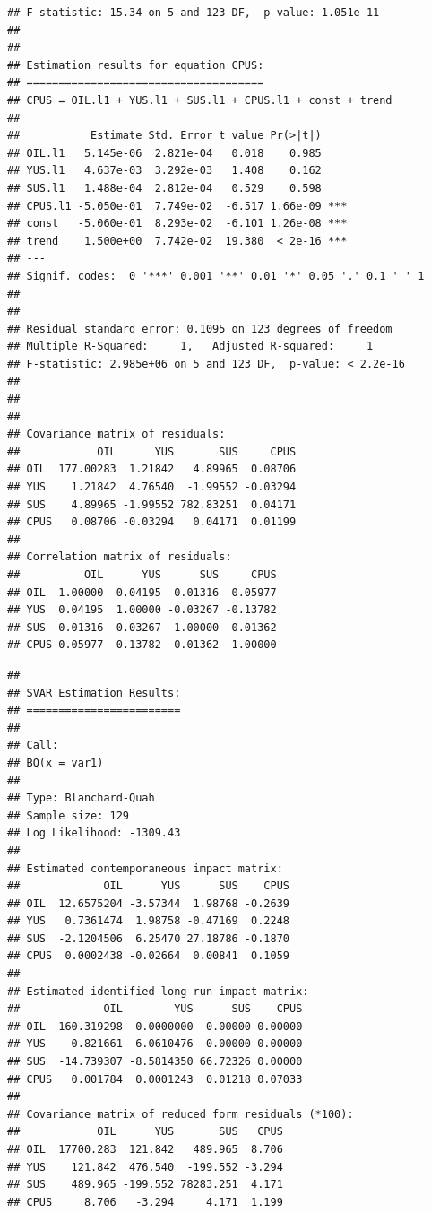 \documentclass[11pt,preprint, authoryear]{elsarticle}
\numberwithin{equation}{section}
\numberwithin{figure}{section}
\numberwithin{table}{section}
\begin{document}
\begin{verbatim}
## F-statistic: 15.34 on 5 and 123 DF,  p-value: 1.051e-11 
## 
## 
## Estimation results for equation CPUS: 
## ===================================== 
## CPUS = OIL.l1 + YUS.l1 + SUS.l1 + CPUS.l1 + const + trend 
## 
##           Estimate Std. Error t value Pr(>|t|)    
## OIL.l1   5.145e-06  2.821e-04   0.018    0.985    
## YUS.l1   4.637e-03  3.292e-03   1.408    0.162    
## SUS.l1   1.488e-04  2.812e-04   0.529    0.598    
## CPUS.l1 -5.050e-01  7.749e-02  -6.517 1.66e-09 ***
## const   -5.060e-01  8.293e-02  -6.101 1.26e-08 ***
## trend    1.500e+00  7.742e-02  19.380  < 2e-16 ***
## ---
## Signif. codes:  0 '***' 0.001 '**' 0.01 '*' 0.05 '.' 0.1 ' ' 1
## 
## 
## Residual standard error: 0.1095 on 123 degrees of freedom
## Multiple R-Squared:     1,   Adjusted R-squared:     1 
## F-statistic: 2.985e+06 on 5 and 123 DF,  p-value: < 2.2e-16 
## 
## 
## 
## Covariance matrix of residuals:
##            OIL      YUS       SUS     CPUS
## OIL  177.00283  1.21842   4.89965  0.08706
## YUS    1.21842  4.76540  -1.99552 -0.03294
## SUS    4.89965 -1.99552 782.83251  0.04171
## CPUS   0.08706 -0.03294   0.04171  0.01199
## 
## Correlation matrix of residuals:
##          OIL      YUS      SUS     CPUS
## OIL  1.00000  0.04195  0.01316  0.05977
## YUS  0.04195  1.00000 -0.03267 -0.13782
## SUS  0.01316 -0.03267  1.00000  0.01362
## CPUS 0.05977 -0.13782  0.01362  1.00000
\end{verbatim}

\begin{verbatim}
## 
## SVAR Estimation Results:
## ======================== 
## 
## Call:
## BQ(x = var1)
## 
## Type: Blanchard-Quah 
## Sample size: 129 
## Log Likelihood: -1309.43 
## 
## Estimated contemporaneous impact matrix:
##             OIL      YUS      SUS    CPUS
## OIL  12.6575204 -3.57344  1.98768 -0.2639
## YUS   0.7361474  1.98758 -0.47169  0.2248
## SUS  -2.1204506  6.25470 27.18786 -0.1870
## CPUS  0.0002438 -0.02664  0.00841  0.1059
## 
## Estimated identified long run impact matrix:
##             OIL        YUS      SUS    CPUS
## OIL  160.319298  0.0000000  0.00000 0.00000
## YUS    0.821661  6.0610476  0.00000 0.00000
## SUS  -14.739307 -8.5814350 66.72326 0.00000
## CPUS   0.001784  0.0001243  0.01218 0.07033
## 
## Covariance matrix of reduced form residuals (*100):
##            OIL      YUS       SUS   CPUS
## OIL  17700.283  121.842   489.965  8.706
## YUS    121.842  476.540  -199.552 -3.294
## SUS    489.965 -199.552 78283.251  4.171
## CPUS     8.706   -3.294     4.171  1.199
\end{verbatim}
\end{document}
